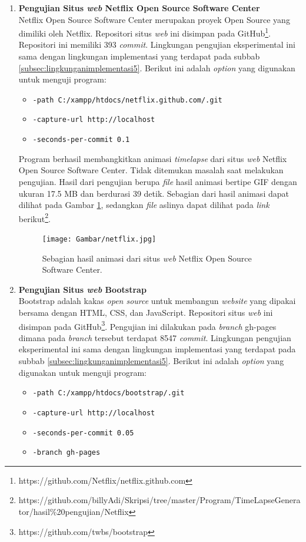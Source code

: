 \begin{enumerate}
\item \textbf{Pengujian Situs \textit{web} Netflix Open Source Software Center}\\
Netflix Open Source Software Center merupakan proyek Open Source yang dimiliki oleh Netflix. Repositori situs \textit{web} ini disimpan pada GitHub\footnote{https://github.com/Netflix/netflix.github.com}. Repositori ini memiliki 393 \textit{commit}. Lingkungan pengujian eksperimental ini sama dengan lingkungan implementasi yang terdapat pada subbab \ref{subsec:lingkunganimplementasi5}. Berikut ini adalah \textit{option} yang digunakan untuk menguji program:
\begin{itemize}
\item \texttt{-path C:/xampp/htdocs/netflix.github.com/.git}
\item \texttt{-capture-url http://localhost}
\item \texttt{-seconds-per-commit 0.1} 
\end{itemize}
Program berhasil membangkitkan animasi \textit{timelapse} dari situs \textit{web} Netflix Open Source Software Center. Tidak ditemukan masalah saat melakukan pengujian. Hasil dari pengujian berupa \textit{file} hasil animasi bertipe GIF dengan ukuran 17.5 MB dan berdurasi 39 detik. Sebagian dari hasil animasi dapat dilihat pada Gambar \ref{fig:hasil_netflix}, sedangkan \textit{file} aslinya dapat dilihat pada \textit{link} berikut\footnote{https://github.com/billyAdi/Skripsi/tree/master/Program/TimeLapseGenerator/hasil\%20pengujian/Netflix}.




\begin{figure}[H]	
		\texttt{[image: Gambar/netflix.jpg]}
	\caption{Sebagian hasil animasi dari situs \textit{web} Netflix Open Source Software Center.}
	\label{fig:hasil_netflix}
\end{figure}



\item \textbf{Pengujian Situs \textit{web} Bootstrap}\\
Bootstrap adalah kakas \textit{open source} untuk membangun \textit{website} yang dipakai bersama dengan HTML, CSS, dan JavaScript. Repositori situs \textit{web} ini disimpan pada GitHub\footnote{https://github.com/twbs/bootstrap}. Pengujian ini dilakukan pada \textit{branch} gh-pages dimana pada \textit{branch} tersebut terdapat 8547 \textit{commit}. Lingkungan pengujian eksperimental ini sama dengan lingkungan implementasi yang terdapat pada subbab \ref{subsec:lingkunganimplementasi5}. 
Berikut ini adalah \textit{option} yang digunakan untuk menguji program:
\begin{itemize}
\item \texttt{-path C:/xampp/htdocs/bootstrap/.git}
\item \texttt{-capture-url http://localhost}
\item \texttt{-seconds-per-commit 0.05} 
\item \texttt{-branch gh-pages}
\end{itemize}


\end{enumerate}
